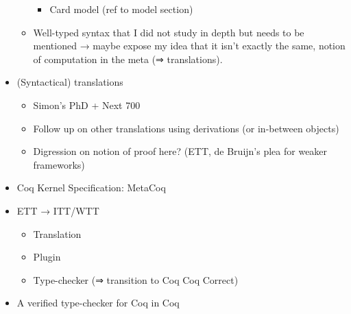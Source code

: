 \begin{itemize}
\begin{itemize}
\begin{itemize}
          \item Card model (ref to model section)
        \end{itemize}
      \item Well-typed syntax that I did not study in depth but needs to be
      mentioned → maybe expose my idea that it isn't exactly the same,
      notion of computation in the meta (⇒ translations).
    \end{itemize}
  \item (Syntactical) translations
    \begin{itemize}
      \item Simon's PhD + Next 700
      \item Follow up on other translations using derivations (or in-between
      objects)
      \item Digression on notion of proof here? (ETT, de Bruijn's plea for
      weaker frameworks)
    \end{itemize}
  \item Coq Kernel Specification: MetaCoq
  \item ETT → ITT/WTT
    \begin{itemize}
      \item Translation
      \item Plugin
      \item Type-checker (⇒ transition to Coq Coq Correct)
    \end{itemize}
  \item A verified type-checker for Coq in Coq
\end{itemize}
